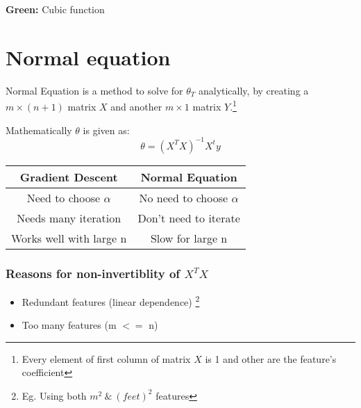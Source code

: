     \textbf {Green:} Cubic function

\section{Normal equation}
  Normal Equation is a method to solve for $\theta_T$ analytically, by creating a $m\times(n+1)$ matrix $X$ and another $m\times1$ matrix $Y$.\footnote[2]{Every element of first column of matrix $X$ is 1 and other are the feature's coefficient}

  Mathematically $\theta$ is given as:
  \begin{equation} \label {eq: theta}
    \theta = (X^TX)^{-1}X^ty
  \end{equation}

  \begin{tabular}{ |c|c|}
    \hline
    \textbf{Gradient Descent} & \textbf{Normal Equation} \\
    \hline
    Need to choose $\alpha$ & No need to choose $\alpha$ \\
    Needs many iteration & Don't need to iterate \\
    Works well with large n & Slow for large n \\
    \hline
  \end{tabular}

  \vspace{5mm}

  \subsubsection{Reasons for non-invertiblity of $X^T X$}
    \begin{itemize}
      \item Redundant features (linear dependence) \footnote[3]{Eg. Using both $m^2 \  \& \  (feet)^2$ features}
      \item Too many features (m $<=$ n) 
    \end{itemize}
